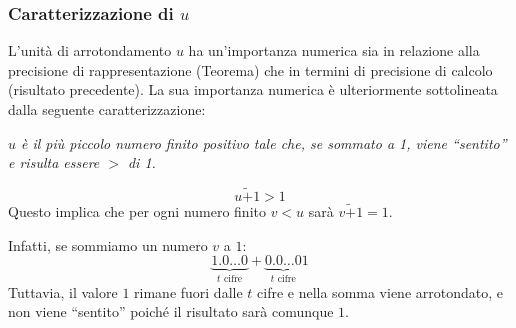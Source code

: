 \documentclass{article}
\numberwithin{equation}{section}
\begin{document}
\subsubsection{Caratterizzazione di $u$}
L'unità di arrotondamento $u$ ha un'importanza numerica sia in relazione alla precisione
di rappresentazione (Teorema) che in termini di precisione di calcolo (risultato precedente).
La sua importanza numerica è ulteriormente sottolineata dalla seguente
caratterizzazione:

\begin{center}
    \emph{$u$ è il più piccolo numero finito positivo tale che, se sommato a
    1, viene ``sentito'' e risulta essere $>$ di 1.}
\end{center}
$$u\tilde+1>1$$
Questo implica che per ogni numero finito $v<u$ sarà $v\tilde+1=1$.

Infatti, se sommiamo un numero $v$ a $1$:
    $$
    \underbrace{1.0 \ldots 0}_{t \text{ cifre}} + \underbrace{0.0 \ldots 0}_{t
    \text{ cifre}}1
    $$
Tuttavia, il valore $1$ rimane fuori dalle $t$ cifre e nella somma viene
arrotondato, e non viene ``sentito'' poiché il risultato sarà comunque $1$.
\end{document}
